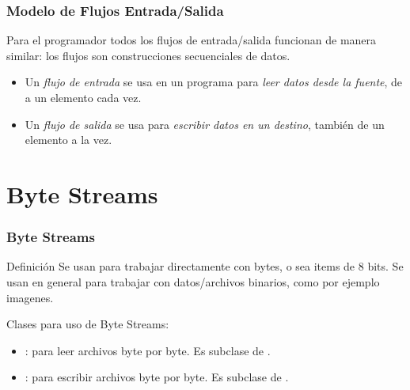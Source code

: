 \documentclass{beamer}
\begin{document}
\begin{frame}
  \frametitle{Modelo de Flujos Entrada/Salida}

  Para el programador todos los flujos de entrada/salida funcionan de
  manera similar: los flujos son construcciones secuenciales de datos.

  \begin{itemize}
  \item Un \emph{flujo de entrada} se usa en un programa para
    \emph{leer datos desde la fuente}, de a un elemento cada vez.
    
  \item Un \emph{flujo de salida} se usa para \emph{escribir datos en
      un destino}, también de un elemento a la vez.
  \end{itemize}
  
\end{frame}

\section{Byte Streams}

\begin{frame}
  \frametitle{Byte Streams}

  \begin{block}{Definición}
    Se usan para trabajar directamente con bytes, o sea items de 8
    bits. Se usan en general para trabajar con datos/archivos
    binarios, como por ejemplo imagenes.
  \end{block}

  Clases para uso de Byte Streams:

  \begin{itemize}

  \item {}: para leer archivos byte por
    byte. Es subclase de .
    
  \item {}: para escribir archivos byte
    por byte. Es subclase de .
    
  \end{itemize}
    
\end{frame}
\end{document}
